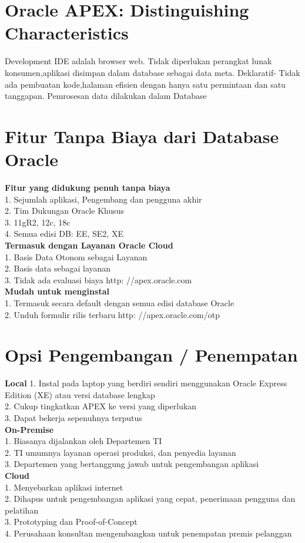 \documentclass[12pt, times new roman, a4paper]{article}
\begin{document}
\section{Oracle APEX: Distinguishing Characteristics}
Development IDE adalah browser web. Tidak diperlukan perangkat lunak konsumen,aplikasi disimpan dalam database sebagai data meta. Deklaratif- Tidak ada pembuatan kode,halaman efisien dengan hanya satu permintaan dan satu tanggapan. Pemrosesan data dilakukan dalam Database\\

\section{Fitur Tanpa Biaya dari Database Oracle}
\textbf{Fitur yang didukung penuh tanpa biaya} \\
1. Sejumlah aplikasi, Pengembang dan pengguna akhir\\
2. Tim Dukungan Oracle Khusus\\
3. 11gR2, 12c, 18c\\
4. Semua edisi DB: EE, SE2, XE\\
\textbf{Termasuk dengan Layanan Oracle Cloud}\\
1. Basis Data Otonom sebagai Layanan \\
2. Basis data sebagai layanan \\
3. Tidak ada evaluasi biaya http: //apex.oracle.com \\
\textbf{Mudah untuk menginstal}\\
1. Termasuk secara default dengan semua edisi database Oracle\\
2. Unduh formulir rilis terbaru http: //apex.oracle.com/otp\\

\section{Opsi Pengembangan / Penempatan}
\textbf{Local}
1. Instal pada laptop yang berdiri sendiri menggunakan Oracle Express Edition (XE) atau versi database lengkap\\
2. Cukup tingkatkan APEX ke versi yang diperlukan\\
3. Dapat bekerja sepenuhnya terputus\\
\textbf{On-Premise}\\
1. Biasanya dijalankan oleh Departemen TI\\
2. TI umumnya layanan operasi produksi, dan penyedia layanan\\
3. Departemen yang bertanggung jawab untuk pengembangan aplikasi\\
\textbf{Cloud}\\
1. Menyebarkan aplikasi internet\\
2. Dihapus untuk pengembangan aplikasi yang cepat, penerimaan pengguna dan pelatihan\\
3. Prototyping dan Proof-of-Concept\\
4. Perusahaan konsultan mengembangkan untuk penempatan premis pelanggan\\
\end{document}
